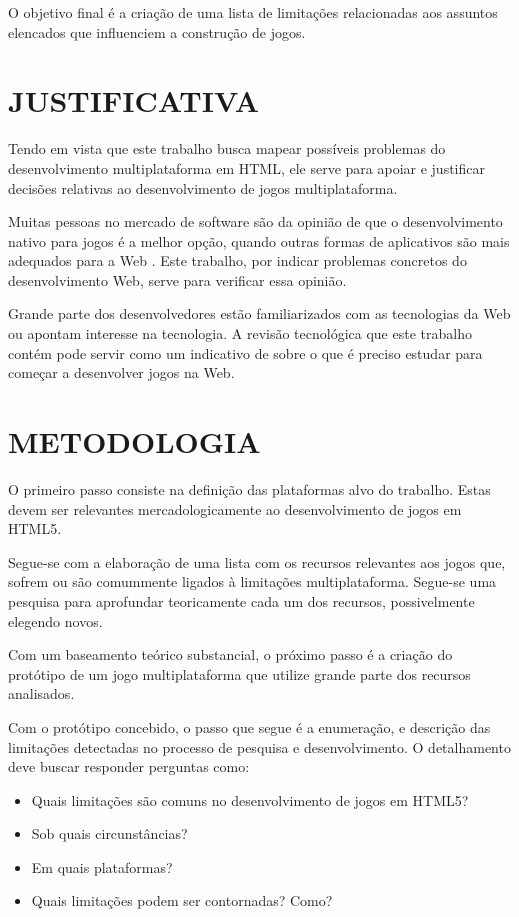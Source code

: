 O objetivo final é a criação de uma lista de limitações relacionadas
aos assuntos elencados que influenciem a construção de jogos.

\section{JUSTIFICATIVA}

Tendo em vista que este trabalho busca mapear possíveis problemas
do desenvolvimento multiplataforma em HTML, ele serve para apoiar
e justificar decisões relativas ao desenvolvimento de jogos
multiplataforma.

Muitas pessoas no mercado de software são da opinião de que o
desenvolvimento nativo para jogos é a melhor opção, quando outras
formas de aplicativos são mais adequados para a Web \citet[p.
21]{aSeriousContender}. Este trabalho, por indicar problemas concretos
do desenvolvimento Web, serve para verificar essa opinião.

Grande parte dos desenvolvedores estão familiarizados com as
tecnologias da Web ou apontam interesse na tecnologia. A revisão
tecnológica que este trabalho contém pode servir como um indicativo
de sobre o que é preciso estudar para começar a desenvolver jogos na
Web.

\section{METODOLOGIA}
\thispagestyle{myheadings}

O primeiro passo consiste na definição das plataformas alvo do trabalho.
Estas devem ser relevantes mercadologicamente ao desenvolvimento de
jogos em HTML5.

Segue-se com a elaboração de uma lista com os recursos relevantes
aos jogos que, sofrem ou são comummente ligados à
limitações multiplataforma. Segue-se uma pesquisa para aprofundar
teoricamente cada um dos recursos, possivelmente elegendo novos.

Com um baseamento teórico substancial, o próximo passo é a criação
do protótipo de um jogo multiplataforma que utilize grande parte dos
recursos analisados.

Com o protótipo concebido, o passo que segue é a enumeração, e
descrição das limitações detectadas no processo de pesquisa e
desenvolvimento. O detalhamento deve buscar responder perguntas como:

\begin{itemize}
\item Quais limitações são comuns no desenvolvimento de jogos em HTML5?
\item Sob quais circunstâncias?
\item Em quais plataformas?
\item Quais limitações podem ser contornadas? Como?
\end{itemize}

